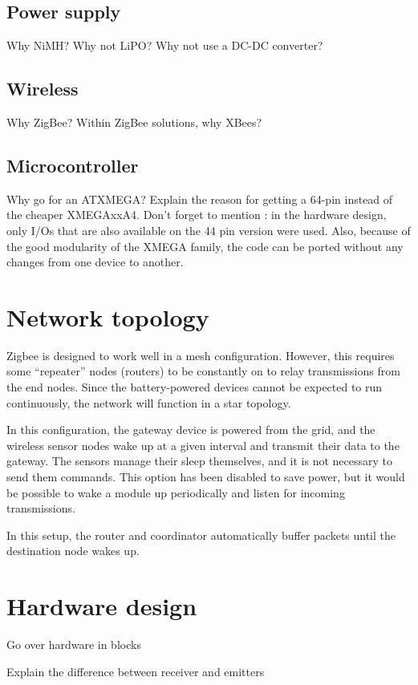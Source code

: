 \subsection{Power supply}
Why NiMH? Why not LiPO? Why not use a DC-DC converter?

\subsection{Wireless}
Why ZigBee? Within ZigBee solutions, why XBees?

\subsection{Microcontroller}
Why go for an ATXMEGA?
Explain the reason for getting a 64-pin instead of the cheaper XMEGAxxA4.
Don't forget to mention : in the hardware design, only I/Os that are also
available on the 44 pin version were used. Also, because of the good modularity
of the XMEGA family, the code can be ported without any changes from one device
to another.

\section{Network topology}

Zigbee is designed to work well in a mesh configuration. However, this requires
some ``repeater'' nodes (routers) to be constantly on to relay transmissions
from the end nodes. Since the battery-powered devices cannot be expected to run
continuously, the network will function in a star topology.

In this configuration, the gateway device is powered from the grid, and the
wireless sensor nodes wake up at a given interval and transmit their data to the
gateway. The sensors manage their sleep themselves, and it is not necessary to
send them commands. This option has been disabled to save power, but it would be
possible to wake a module up periodically and listen for incoming transmissions.

In this setup, the router and coordinator automatically buffer packets until the
destination node wakes up.
\section{Hardware design}

Go over hardware in blocks

Explain the difference between receiver and emitters

